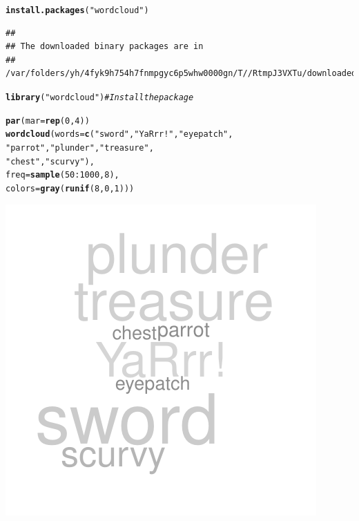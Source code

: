 \documentclass{tufte-book}\usepackage[]{graphicx}\usepackage[]{color}
\makeatletter
\def\maxwidth{ %
  \ifdim\Gin@nat@width>\linewidth
    \linewidth
  \else
    \Gin@nat@width
  \fi
}
\newcommand{\hlnum}[1]{\textcolor[rgb]{0.686,0.059,0.569}{#1}}%
\newcommand{\hlstr}[1]{\textcolor[rgb]{0.192,0.494,0.8}{#1}}%
\newcommand{\hlcom}[1]{\textcolor[rgb]{0.678,0.584,0.686}{\textit{#1}}}%
\newcommand{\hlopt}[1]{\textcolor[rgb]{0,0,0}{#1}}%
\newcommand{\hlstd}[1]{\textcolor[rgb]{0.345,0.345,0.345}{#1}}%
\newcommand{\hlkwc}[1]{\textcolor[rgb]{0.333,0.667,0.333}{#1}}%
\newcommand{\hlkwd}[1]{\textcolor[rgb]{0.737,0.353,0.396}{\textbf{#1}}}%
\newenvironment{kframe}{%
 \def\at@end@of@kframe{}%
 \ifinner\ifhmode%
  \def\at@end@of@kframe{\end{minipage}}%
  \begin{minipage}{\columnwidth}%
 \fi\fi%
 \def\FrameCommand##1{\hskip\@totalleftmargin \hskip-\fboxsep
 \colorbox{shadecolor}{##1}\hskip-\fboxsep
     \hskip-\linewidth \hskip-\@totalleftmargin \hskip\columnwidth}%
 \MakeFramed {\advance\hsize-\width
   \@totalleftmargin\z@ \linewidth\hsize
   \@setminipage}}%
 {\par\unskip\endMakeFramed%
 \at@end@of@kframe}
\newenvironment{knitrout}{}{} %
\makeatother
\begin{document}
\begin{footnotesize}
\begin{knitrout}
\color{fgcolor}\begin{kframe}
\begin{alltt}
\hlkwd{install.packages}\hlstd{(}\hlstr{"wordcloud"}\hlstd{)}
\end{alltt}
\begin{verbatim}
## 
## The downloaded binary packages are in
## 	/var/folders/yh/4fyk9h754h7fnmpgyc6p5whw0000gn/T//RtmpJ3VXTu/downloaded_packages
\end{verbatim}
\begin{alltt}
\hlkwd{library}\hlstd{(}\hlstr{"wordcloud"}\hlstd{)} \hlcom{# Install the package}
\end{alltt}


{\ttfamily\noindent\itshape\color{messagecolor}{\#\# Loading required package: RColorBrewer}}\begin{alltt}
\hlkwd{par}\hlstd{(}\hlkwc{mar} \hlstd{=} \hlkwd{rep}\hlstd{(}\hlnum{0}\hlstd{,} \hlnum{4}\hlstd{))}
\hlkwd{wordcloud}\hlstd{(}\hlkwc{words} \hlstd{=} \hlkwd{c}\hlstd{(}\hlstr{"sword"}\hlstd{,} \hlstr{"YaRrr!"}\hlstd{,} \hlstr{"eyepatch"}\hlstd{,}
                    \hlstr{"parrot"}\hlstd{,} \hlstr{"plunder"}\hlstd{,} \hlstr{"treasure"}\hlstd{,}
                    \hlstr{"chest"}\hlstd{,} \hlstr{"scurvy"}\hlstd{),}
          \hlkwc{freq} \hlstd{=} \hlkwd{sample}\hlstd{(}\hlnum{50}\hlopt{:}\hlnum{1000}\hlstd{,} \hlnum{8}\hlstd{),}
          \hlkwc{colors} \hlstd{=} \hlkwd{gray}\hlstd{(}\hlkwd{runif}\hlstd{(}\hlnum{8}\hlstd{,} \hlnum{0}\hlstd{,} \hlnum{1}\hlstd{)))}
\end{alltt}
\end{kframe}
\includegraphics[width=\maxwidth]{figure/unnamed-chunk-6-1} 

\end{knitrout}
\end{footnotesize}
\end{document}
